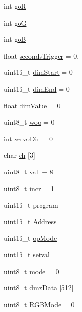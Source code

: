 \begin{DoxyCompactItemize}
int \mbox{\hyperlink{satej__matthew_8c_a528b21c5fb0c0fcf4fe8f8bc549644b3}{goR}}
\item 
int \mbox{\hyperlink{satej__matthew_8c_a0cc12126d1ecb5d449eb84ba09e7c625}{goG}}
\item 
int \mbox{\hyperlink{satej__matthew_8c_ae235a503c0bb6555e108f17b7edbd747}{goB}}
\item 
float \mbox{\hyperlink{satej__matthew_8c_ab7e143110d340e731fa81edab74b60dd}{seconds\+Trigger}} = 0.
\item 
uint16\+\_\+t \mbox{\hyperlink{satej__matthew_8c_ad2e81110ac5d5101e2b8b67c4458bae3}{dim\+Start}} = 0
\item 
uint16\+\_\+t \mbox{\hyperlink{satej__matthew_8c_ac4542092d3e67f5fcb7f5ac24e6778c2}{dim\+End}} = 0
\item 
float \mbox{\hyperlink{satej__matthew_8c_a2dfb3db6e969929dc4c426fc2a65cc69}{dim\+Value}} = 0
\item 
uint8\+\_\+t \mbox{\hyperlink{satej__matthew_8c_a45597431413ee9d8b4226bad6151cdc0}{woo}} = 0
\item 
int \mbox{\hyperlink{satej__matthew_8c_a4569da2d36a3fe621d19ed0ffad1a67b}{servo\+Dir}} = 0
\item 
char \mbox{\hyperlink{satej__matthew_8c_afd57a52a89b95928a54f8a6175a10486}{ch}} \mbox{[}3\mbox{]}
\item 
uint8\+\_\+t \mbox{\hyperlink{satej__matthew_8c_a426799fe4a09815b45a213ed9f277065}{vall}} = 8
\item 
uint8\+\_\+t \mbox{\hyperlink{satej__matthew_8c_adbd7138430ce795e6dd1d4534fccfc13}{incr}} = 1
\item 
uint16\+\_\+t \mbox{\hyperlink{satej__matthew_8c_a66ab3de6d3d072bd8495172c02a442f0}{program}}
\item 
uint16\+\_\+t \mbox{\hyperlink{satej__matthew_8c_a749532d9fcee171290bbfbe7859e6ba7}{Address}}
\item 
uint16\+\_\+t \mbox{\hyperlink{satej__matthew_8c_a1aa9db2f061e57b247665a13005b6ea5}{op\+Mode}}
\item 
uint16\+\_\+t \mbox{\hyperlink{satej__matthew_8c_a3be316f37343a45da2f52754d352df9b}{setval}}
\item 
uint8\+\_\+t \mbox{\hyperlink{satej__matthew_8c_a37e90f5e3bd99fac2021fb3a326607d4}{mode}} = 0
\item 
uint8\+\_\+t \mbox{\hyperlink{satej__matthew_8c_a94df0a1f870976c09bb86a0885b47388}{dmx\+Data}} \mbox{[}512\mbox{]}
\item 
uint8\+\_\+t \mbox{\hyperlink{satej__matthew_8c_ab6c75a184c9e2f11ff1237e857250b3d}{R\+G\+B\+Mode}} = 0
\end{DoxyCompactItemize}



